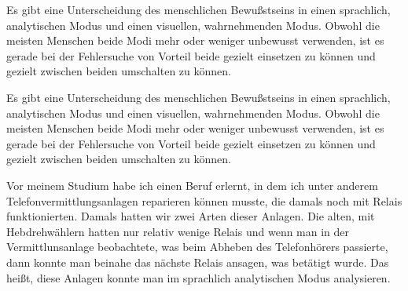 \begin{abstractsec}
  Es gibt eine Unterscheidung des menschlichen Bewußstseins in einen
  sprachlich, analytischen Modus und einen visuellen, wahrnehmenden Modus.
  Obwohl die meisten Menschen beide Modi mehr oder weniger unbewusst
  verwenden, ist es gerade bei der Fehlersuche von Vorteil beide gezielt
  einsetzen zu können und gezielt zwischen beiden umschalten zu können.
\end{abstractsec}
\begin{normaltext}
  Es gibt eine Unterscheidung des menschlichen Bewußstseins in einen
  sprachlich, analytischen Modus und einen visuellen, wahrnehmenden Modus.
  Obwohl die meisten Menschen beide Modi mehr oder weniger unbewusst
  verwenden, ist es gerade bei der Fehlersuche von Vorteil beide gezielt
  einsetzen zu können und gezielt zwischen beiden umschalten zu können.

  Vor meinem Studium habe ich einen Beruf erlernt, in dem ich unter anderem
  Telefonvermittlungsanlagen reparieren können musste, die damals noch mit
  Relais funktionierten. Damals hatten wir zwei Arten dieser Anlagen. Die
  alten, mit Hebdrehwählern hatten nur relativ wenige Relais und wenn man in
  der Vermittlunsanlage beobachtete, was beim Abheben des Telefonhörers
  passierte, dann konnte man beinahe das nächste Relais ansagen, was betätigt
  wurde. Das heißt, diese Anlagen konnte man im sprachlich analytischen Modus
  analysieren.


\end{normaltext}

